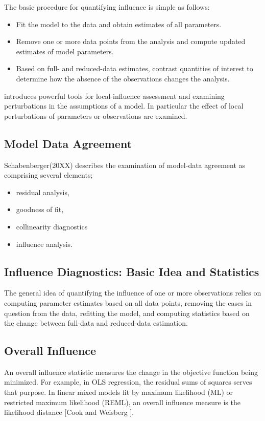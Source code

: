 \documentclass[Main.tex]{subfiles}
\begin{document}
	
	The basic procedure for quantifying influence is simple as follows:
	
	
	\begin{itemize}
		\item Fit the model to the data and obtain estimates of all parameters.
		\item Remove one or more data points from the analysis and compute updated estimates of model parameters.
		\item Based on full- and reduced-data estimates, contrast quantities of interest to determine how the absence of the observations changes the analysis.
	\end{itemize}
	
	
	\citet{cook86} introduces powerful tools for local-influence assessment and examining perturbations in the assumptions of a model. In particular the effect of local perturbations of parameters or observations are examined.
	
	
	
	
	

	
	\subsection{Model Data Agreement}
	Schabenberger(20XX) describes the examination of model-data agreement as comprising several elements; \begin{itemize}
	\item residual analysis, 
	\item goodness of fit, 
	\item collinearity diagnostics
	\item influence analysis.
		\end{itemize}
	\subsection{Influence Diagnostics: Basic Idea and Statistics} %
	
	The general idea of quantifying the influence of one or more observations relies on computing parameter estimates based on all data points, removing the cases in question from the data, refitting the model, and computing statistics based on the change between full-data and reduced-data estimation. 
	
	
	\subsection{Overall Influence}
	An overall influence statistic measures the change in the objective function being minimized. For example, in
	OLS regression, the residual sums of squares serves that purpose. In linear mixed models fit by
	 maximum likelihood (ML) or  restricted maximum likelihood (REML), an overall influence measure is the  likelihood distance [Cook and Weisberg ].
	
\end{document}
